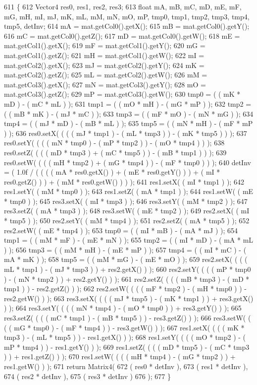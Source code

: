 \begin{DoxyCode}
611 \{
612     Vector4 res0, res1, res2, res3;
613     \textcolor{keywordtype}{float} mA, mB, mC, mD, mE, mF, mG, mH, mI, mJ, mK, mL, mM, mN, mO, mP, tmp0, tmp1, tmp2, tmp3, tmp4, 
      tmp5, detInv;
614     mA = mat.getCol0().getX();
615     mB = mat.getCol0().getY();
616     mC = mat.getCol0().getZ();
617     mD = mat.getCol0().getW();
618     mE = mat.getCol1().getX();
619     mF = mat.getCol1().getY();
620     mG = mat.getCol1().getZ();
621     mH = mat.getCol1().getW();
622     mI = mat.getCol2().getX();
623     mJ = mat.getCol2().getY();
624     mK = mat.getCol2().getZ();
625     mL = mat.getCol2().getW();
626     mM = mat.getCol3().getX();
627     mN = mat.getCol3().getY();
628     mO = mat.getCol3().getZ();
629     mP = mat.getCol3().getW();
630     tmp0 = ( ( mK * mD ) - ( mC * mL ) );
631     tmp1 = ( ( mO * mH ) - ( mG * mP ) );
632     tmp2 = ( ( mB * mK ) - ( mJ * mC ) );
633     tmp3 = ( ( mF * mO ) - ( mN * mG ) );
634     tmp4 = ( ( mJ * mD ) - ( mB * mL ) );
635     tmp5 = ( ( mN * mH ) - ( mF * mP ) );
636     res0.setX( ( ( ( mJ * tmp1 ) - ( mL * tmp3 ) ) - ( mK * tmp5 ) ) );
637     res0.setY( ( ( ( mN * tmp0 ) - ( mP * tmp2 ) ) - ( mO * tmp4 ) ) );
638     res0.setZ( ( ( ( mD * tmp3 ) + ( mC * tmp5 ) ) - ( mB * tmp1 ) ) );
639     res0.setW( ( ( ( mH * tmp2 ) + ( mG * tmp4 ) ) - ( mF * tmp0 ) ) );
640     detInv = ( 1.0f / ( ( ( ( mA * res0.getX() ) + ( mE * res0.getY() ) ) + ( mI * res0.getZ() ) ) + ( mM *
       res0.getW() ) ) );
641     res1.setX( ( mI * tmp1 ) );
642     res1.setY( ( mM * tmp0 ) );
643     res1.setZ( ( mA * tmp1 ) );
644     res1.setW( ( mE * tmp0 ) );
645     res3.setX( ( mI * tmp3 ) );
646     res3.setY( ( mM * tmp2 ) );
647     res3.setZ( ( mA * tmp3 ) );
648     res3.setW( ( mE * tmp2 ) );
649     res2.setX( ( mI * tmp5 ) );
650     res2.setY( ( mM * tmp4 ) );
651     res2.setZ( ( mA * tmp5 ) );
652     res2.setW( ( mE * tmp4 ) );
653     tmp0 = ( ( mI * mB ) - ( mA * mJ ) );
654     tmp1 = ( ( mM * mF ) - ( mE * mN ) );
655     tmp2 = ( ( mI * mD ) - ( mA * mL ) );
656     tmp3 = ( ( mM * mH ) - ( mE * mP ) );
657     tmp4 = ( ( mI * mC ) - ( mA * mK ) );
658     tmp5 = ( ( mM * mG ) - ( mE * mO ) );
659     res2.setX( ( ( ( mL * tmp1 ) - ( mJ * tmp3 ) ) + res2.getX() ) );
660     res2.setY( ( ( ( mP * tmp0 ) - ( mN * tmp2 ) ) + res2.getY() ) );
661     res2.setZ( ( ( ( mB * tmp3 ) - ( mD * tmp1 ) ) - res2.getZ() ) );
662     res2.setW( ( ( ( mF * tmp2 ) - ( mH * tmp0 ) ) - res2.getW() ) );
663     res3.setX( ( ( ( mJ * tmp5 ) - ( mK * tmp1 ) ) + res3.getX() ) );
664     res3.setY( ( ( ( mN * tmp4 ) - ( mO * tmp0 ) ) + res3.getY() ) );
665     res3.setZ( ( ( ( mC * tmp1 ) - ( mB * tmp5 ) ) - res3.getZ() ) );
666     res3.setW( ( ( ( mG * tmp0 ) - ( mF * tmp4 ) ) - res3.getW() ) );
667     res1.setX( ( ( ( mK * tmp3 ) - ( mL * tmp5 ) ) - res1.getX() ) );
668     res1.setY( ( ( ( mO * tmp2 ) - ( mP * tmp4 ) ) - res1.getY() ) );
669     res1.setZ( ( ( ( mD * tmp5 ) - ( mC * tmp3 ) ) + res1.getZ() ) );
670     res1.setW( ( ( ( mH * tmp4 ) - ( mG * tmp2 ) ) + res1.getW() ) );
671     \textcolor{keywordflow}{return} Matrix4(
672         ( res0 * detInv ),
673         ( res1 * detInv ),
674         ( res2 * detInv ),
675         ( res3 * detInv )
676     );
677 \}
\end{DoxyCode}
